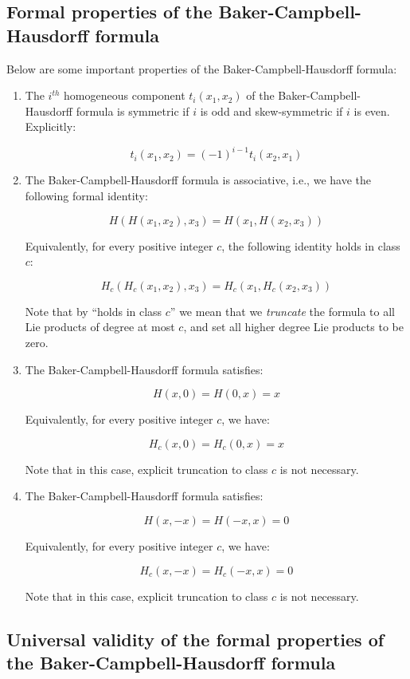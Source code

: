 \documentclass{ucetd}
\begin{document}
\subsection{Formal properties of the Baker-Campbell-Hausdorff formula}\label{sec:bch-formal-properties}

Below are some important properties of the Baker-Campbell-Hausdorff
formula:

\begin{enumerate}
\item The $i^{th}$ homogeneous component $t_i(x_1,x_2)$ of the
  Baker-Campbell-Hausdorff formula is symmetric if $i$ is odd and
  skew-symmetric if $i$ is even. Explicitly:

  $$t_i(x_1,x_2) = (-1)^{i-1}t_i(x_2,x_1)$$

\item The Baker-Campbell-Hausdorff formula is associative, i.e., we
  have the following formal identity:

  $$H(H(x_1,x_2),x_3) = H(x_1,H(x_2,x_3))$$

  Equivalently, for every positive integer $c$, the following identity
  holds in class $c$:

  $$H_c(H_c(x_1,x_2),x_3) = H_c(x_1,H_c(x_2,x_3))$$

  Note that by ``holds in class $c$'' we mean that we {\em truncate}
  the formula to all Lie products of degree at most $c$, and set all
  higher degree Lie products to be zero.
\item The Baker-Campbell-Hausdorff formula satisfies:

  $$H(x,0) = H(0,x) = x$$

  Equivalently, for every positive integer $c$, we have:

  $$H_c(x,0) = H_c(0,x) = x$$

  Note that in this case, explicit truncation to class $c$ is not
  necessary.

\item The Baker-Campbell-Hausdorff formula satisfies:

  $$H(x,-x) = H(-x,x) = 0$$

  Equivalently, for every positive integer $c$, we have:

  $$H_c(x,-x) = H_c(-x,x) = 0$$

  Note that in this case, explicit truncation to class $c$ is not
  necessary.
\end{enumerate}

\subsection{Universal validity of the formal properties of the Baker-Campbell-Hausdorff formula}\label{sec:bch-formula-universal-lie-validity}
\end{document}
